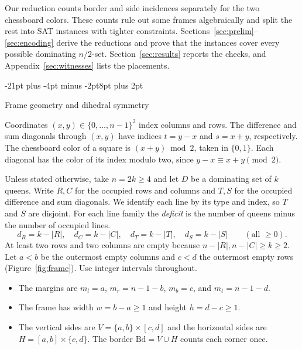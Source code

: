 \documentclass[11pt,a4paper]{article}
\makeatletter
\renewcommand{\section}{\@startsection{section}{1}{\z@}%
  {-21pt plus -4pt minus -2pt}{8pt plus 2pt}%
  {\normalfont\fontsize{14}{17}\selectfont\bfseries\raggedright}}
\theoremstyle{result}
\theoremstyle{definition}
\theoremstyle{remark}
\newcommand{\Bd}{\mathrm{Bd}}
\makeatother
\begin{document}
Our reduction counts border and side incidences separately for
the two chessboard colors. These counts rule out some frames
algebraically and split the rest into SAT instances with tighter
constraints. Sections~\ref{sec:prelim}--\ref{sec:encoding} derive
the reductions and prove that the instances cover every possible
dominating $n/2$-set. Section~\ref{sec:results} reports the checks,
and Appendix~\ref{sec:witnesses} lists the placements.

\section{Frame geometry and dihedral symmetry}\label{sec:prelim}

Coordinates $(x,y)\in\{0,\ldots,n-1\}^2$ index columns and rows.
The difference and sum diagonals through $(x,y)$ have indices
$t=y-x$ and $s=x+y$, respectively. The chessboard color of a square
is $(x+y)\bmod 2$, taken in $\{0,1\}$. Each diagonal has the color
of its index modulo two, since $y-x\equiv x+y\pmod 2$.

Unless stated otherwise, take $n=2k\ge4$ and let $D$ be a
dominating set of $k$ queens. Write $R,C$ for the occupied rows and
columns and $T,S$ for the occupied difference and sum diagonals.
We identify each line by its type and index, so $T$ and $S$ are
disjoint. For each line family the \emph{deficit} is the number of
queens minus the number of occupied lines.
\[
  d_R = k - |R|, \quad d_C = k - |C|, \quad d_T = k - |T|, \quad d_S = k - |S| \qquad (\text{all } \ge 0).
\]
At least two rows and two columns are empty because
$n-|R|,n-|C|\ge k\ge2$. Let $a<b$ be the outermost empty columns
and $c<d$ the outermost empty rows (Figure~\ref{fig:frame}).
Use integer intervals throughout.
\begin{itemize}[leftmargin=1.8em,itemsep=2pt]
  \item The margins are $m_l=a$, $m_r=n-1-b$, $m_b=c$, and $m_t=n-1-d$.
  \item The frame has width $w=b-a\ge1$ and height $h=d-c\ge1$.
  \item The vertical sides are $V=\{a,b\}\times[c,d]$ and the horizontal
    sides are $H=[a,b]\times\{c,d\}$. The border $\Bd=V\cup H$ counts each
    corner once.
\end{itemize}
\end{document}
